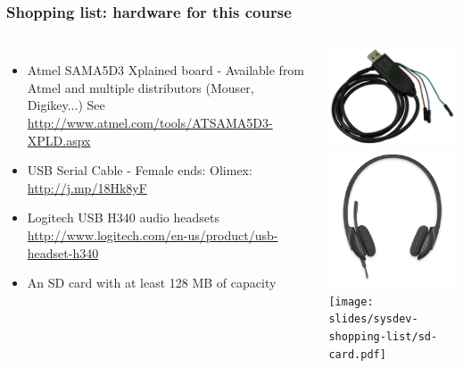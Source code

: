 \begin{frame}
\frametitle{Shopping list: hardware for this course}
  \begin{columns}
    \footnotesize
    \begin{itemize}
      \item Atmel SAMA5D3 Xplained board - Available from Atmel and
 	    multiple distributors (Mouser, Digikey...)
	    See \url{http://www.atmel.com/tools/ATSAMA5D3-XPLD.aspx}
      \item USB Serial Cable - Female ends:
	    Olimex: \url{http://j.mp/18Hk8yF} \\
      \item Logitech USB H340 audio headsets
	    \url{http://www.logitech.com/en-us/product/usb-headset-h340} \\
      \item An SD card with at least 128 MB of capacity
    \end{itemize}
    \includegraphics[height=0.20\textheight]{slides/kernel-shopping-list/usb-serial-cable-female.png} \\
    \includegraphics[height=0.15\textheight]{slides/sysdev-shopping-list/logitech-h340.png} \\
    \texttt{[image: slides/sysdev-shopping-list/sd-card.pdf]}
  \end{columns}
\end{frame}
